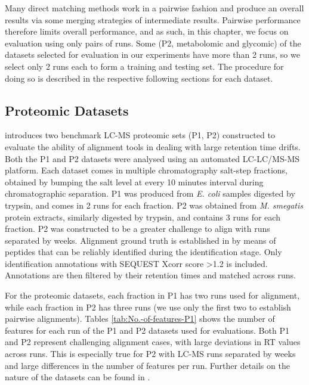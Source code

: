 Many direct matching methods work in a pairwise fashion and produce an overall results via some merging strategies of intermediate results. Pairwise performance therefore limits overall performance, and as such, in this chapter, we focus on evaluation using only pairs of runs. Some (P2, metabolomic and glycomic) of the datasets selected for evaluation in our experiments have more than 2 runs, so we select only 2 runs each to form a training and testing set. The procedure for doing so is described in the respective following sections for each dataset.

\subsection{Proteomic Datasets\label{sub:proteomic-dataset}}

\cite{Lange2008} introduces two benchmark LC-MS proteomic sets (P1, P2) constructed to evaluate the ability of alignment tools in dealing with large retention time drifts. Both the P1 and P2 datasets were analysed using an automated LC-LC/MS-MS platform. Each dataset comes in multiple chromatography salt-step fractions, obtained by bumping the salt level at every 10 minutes interval during chromatographic separation. P1 was produced from \textrm{\textit{E. coli}} samples digested by trypsin, and comes in 2 runs for each fraction. P2 was obtained from \textrm{\textit{M. smegatis}} protein extracts, similarly digested by trypsin, and contains 3 runs for each fraction. P2 was constructed to be a greater challenge to align with runs separated by weeks. Alignment ground truth is established in \cite{Lange2008} by means of peptides that can be reliably identified during the identification stage. Only identification annotations with SEQUEST Xcorr score \textgreater 1.2 is included. Annotations are then filtered by their retention times and matched across runs. 

For the proteomic datasets, each fraction in P1 has two runs used for alignment, while each fraction in P2 has three runs (we use only the first two to establish pairwise alignments). Tables \ref{tab:No.-of-features-P1} shows the number of features for each run of the P1 and P2 datasets used for evaluations. Both P1 and P2 represent challenging alignment cases, with large deviations in RT values across runs. This is especially true for P2 with LC-MS runs separated by weeks and large differences in the number of features per run. Further details on the nature of the datasets can be found in \cite{Lange2008}. 

